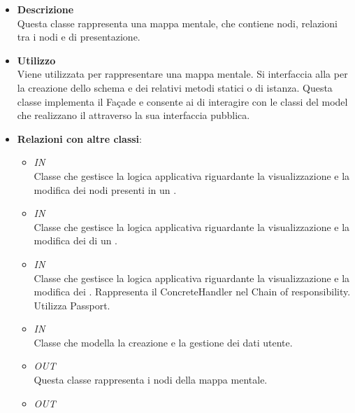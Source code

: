 \begin{itemize}
\item \textbf{Descrizione}\\
Questa classe rappresenta una mappa mentale, che contiene nodi, relazioni tra i nodi e  di presentazione.
\item \textbf{Utilizzo}\\
Viene utilizzata per rappresentare una mappa mentale. Si interfaccia alla   per la creazione dello schema e dei relativi metodi statici o di istanza. Questa classe implementa il  Façade e consente ai  di interagire con le classi del model che realizzano il  attraverso la sua interfaccia pubblica.
\item \textbf{Relazioni con altre classi}:
\begin{itemize}
\item \textit{IN} \hyperref[\nogloxy{Premi::Back-End::App::Controllers::Projects::NodeController}]{}\\
Classe che gestisce la logica applicativa riguardante la visualizzazione e la modifica dei nodi presenti in un .
\item \textit{IN} \hyperref[\nogloxy{Premi::Back-End::App::Controllers::Projects::PathController}]{}\\
Classe che gestisce la logica applicativa riguardante la visualizzazione e la modifica dei  di un .
\item \textit{IN} \hyperref[\nogloxy{Premi::Back-End::App::Controllers::Projects::ProjectManagementController}]{}\\
Classe che gestisce la logica applicativa riguardante la visualizzazione e la modifica dei . Rappresenta il ConcreteHandler nel  Chain of responsibility. Utilizza Passport.
\item \textit{IN} \hyperref[\nogloxy{Premi::Back-End::App::Models::UserModel}]{}\\
Classe che modella la creazione e la gestione dei dati utente.
\item \textit{OUT} \hyperref[\nogloxy{Premi::Back-End::App::Models::NodeModel}]{}\\
Questa classe rappresenta i nodi della mappa mentale.
\item \textit{OUT} \hyperref[\nogloxy{Premi::Back-End::App::Models::PathModel}]{}\\

\end{itemize}
\end{itemize}
